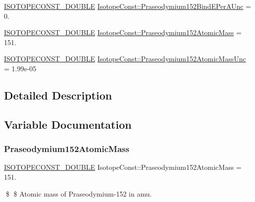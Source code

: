 \begin{DoxyCompactItemize}
\item 
\mbox{\hyperlink{group___isotope_const-_macros_ga8f45a7272ce02c0b4c65c44636ed719a}{I\+S\+O\+T\+O\+P\+E\+C\+O\+N\+S\+T\+\_\+\+D\+O\+U\+B\+LE}} \mbox{\hyperlink{group___isotope_const-_praseodymium-_pr152_gae6bd66795ebf80995b20e0d33966ad37}{Isotope\+Const\+::\+Praseodymium152\+Bind\+E\+Per\+A\+Unc}} = 0.
\item 
\mbox{\hyperlink{group___isotope_const-_macros_ga8f45a7272ce02c0b4c65c44636ed719a}{I\+S\+O\+T\+O\+P\+E\+C\+O\+N\+S\+T\+\_\+\+D\+O\+U\+B\+LE}} \mbox{\hyperlink{group___isotope_const-_praseodymium-_pr152_gae0f17c43c43f149ada788ad99aa76c84}{Isotope\+Const\+::\+Praseodymium152\+Atomic\+Mass}} = 151.
\item 
\mbox{\hyperlink{group___isotope_const-_macros_ga8f45a7272ce02c0b4c65c44636ed719a}{I\+S\+O\+T\+O\+P\+E\+C\+O\+N\+S\+T\+\_\+\+D\+O\+U\+B\+LE}} \mbox{\hyperlink{group___isotope_const-_praseodymium-_pr152_gaf7cab0a92e028f2457a39a3f0d12eee5}{Isotope\+Const\+::\+Praseodymium152\+Atomic\+Mass\+Unc}} = 1.\+99e-\/05
\end{DoxyCompactItemize}


\subsection{Detailed Description}


\subsection{Variable Documentation}
\mbox{\label{group___isotope_const-_praseodymium-_pr152_gae0f17c43c43f149ada788ad99aa76c84}} 
\subsubsection{\texorpdfstring{Praseodymium152\+Atomic\+Mass}{Praseodymium152AtomicMass}}
{\footnotesize\ttfamily \mbox{\hyperlink{group___isotope_const-_macros_ga8f45a7272ce02c0b4c65c44636ed719a}{I\+S\+O\+T\+O\+P\+E\+C\+O\+N\+S\+T\+\_\+\+D\+O\+U\+B\+LE}} Isotope\+Const\+::\+Praseodymium152\+Atomic\+Mass = 151.}

\$ \$ Atomic mass of Praseodymium-\/152 in amu. \mbox{\label{group___isotope_const-_praseodymium-_pr152_gaf7cab0a92e028f2457a39a3f0d12eee5}} 
